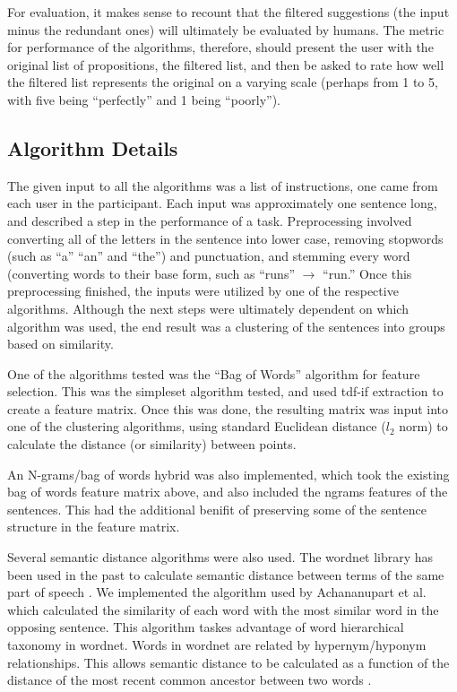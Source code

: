 For evaluation, it makes sense to recount that the filtered suggestions (the input minus the redundant ones) will ultimately be evaluated by humans. The metric for performance of the algorithms, therefore, should present the user with the original list of propositions, the filtered list, and then be asked to rate how well the filtered list represents the original on a varying scale (perhaps from 1 to 5, with five being ``perfectly'' and 1 being ``poorly'').

\subsection{Algorithm Details}
The given input to all the algorithms was a list of instructions, one came from each user in the participant.
Each input was approximately one sentence long, and described a step in the performance of a task.
Preprocessing involved converting all of the letters in the sentence into lower case, removing stopwords (such as ``a'' ``an'' and ``the'') and punctuation, and stemming every word (converting words to their base form, such as ``runs'' $\rightarrow$ ``run.''
Once this preprocessing finished, the inputs were utilized by one of the respective algorithms.
Although the next steps were ultimately dependent on which algorithm was used, the end result was a clustering of the sentences into groups based on similarity.

One of the algorithms tested was the ``Bag of Words'' algorithm for feature selection.
This was the simpleset algorithm tested, and used tdf-if extraction to create a feature matrix.
Once this was done, the resulting matrix was input into one of the clustering algorithms, using standard Euclidean distance ($l_2$ norm) to calculate the distance (or similarity) between points.

An N-grams/bag of words hybrid was also implemented, which took the existing bag of words feature matrix above, and also included the ngrams features of the sentences. 
This had the additional benifit of preserving some of the sentence structure in the feature matrix.

Several semantic distance algorithms were also used.
The wordnet library has been used in the past to calculate semantic distance between terms of the same part of speech \cite{achananuparp2008evaluation, abdalgader2011short}. 
We implemented the algorithm used by Achananupart et al. which calculated the similarity of each word with the most similar word in the opposing sentence. 
This algorithm taskes advantage of word hierarchical taxonomy in wordnet. 
Words in wordnet are related by hypernym/hyponym relationships. 
This allows semantic distance to be calculated as a function of the distance of the most recent common ancestor between two words \cite{abdalgader2011short}.

